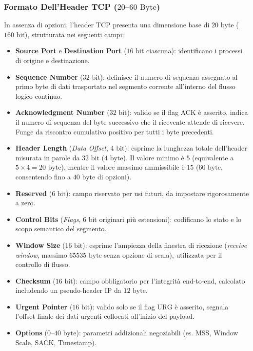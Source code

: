 \documentclass[11pt, a4paper]{article}
\begin{document}
\subsubsection{Formato Dell'Header TCP ($20\text{--}60\text{ Byte}$)}
In assenza di opzioni, l'header TCP presenta una dimensione base di $20\text{ byte}$ ($160\text{ bit}$), strutturata nei seguenti campi:
\begin{itemize}
    \item \textbf{Source Port} e \textbf{Destination Port} ($16\text{ bit}$ ciascuna): identificano i processi di origine e destinazione.
    \item \textbf{Sequence Number} ($32\text{ bit}$): definisce il numero di sequenza assegnato al primo byte di dati trasportato nel segmento corrente all'interno del flusso logico continuo.
    \item \textbf{Acknowledgment Number} ($32\text{ bit}$): valido se il flag ACK è asserito, indica il numero di sequenza del byte successivo che il ricevente attende di ricevere. Funge da riscontro cumulativo positivo per tutti i byte precedenti.
    \item \textbf{Header Length} (\emph{Data Offset}, $4\text{ bit}$): esprime la lunghezza totale dell'header misurata in parole da $32\text{ bit}$ ($4\text{ byte}$). Il valore minimo è $5$ (equivalente a $5 \times 4 = 20\text{ byte}$), mentre il valore massimo ammissibile è $15$ ($60\text{ byte}$, consentendo fino a $40\text{ byte}$ di opzioni).
    \item \textbf{Reserved} ($6\text{ bit}$): campo riservato per usi futuri, da impostare rigorosamente a zero.
    \item \textbf{Control Bits} (\emph{Flags}, $6$ bit originari più estensioni): codificano lo stato e lo scopo semantico del segmento.
    \item \textbf{Window Size} ($16\text{ bit}$): esprime l'ampiezza della finestra di ricezione (\emph{receive window}, massimo $65535\text{ byte}$ senza opzione di scala), utilizzata per il controllo di flusso.
    \item \textbf{Checksum} ($16\text{ bit}$): campo obbligatorio per l'integrità end-to-end, calcolato includendo un pseudo-header IP da $12\text{ byte}$.
    \item \textbf{Urgent Pointer} ($16\text{ bit}$): valido solo se il flag URG è asserito, segnala l'offset finale dei dati urgenti collocati all'inizio del payload.
    \item \textbf{Options} ($0$--$40\text{ byte}$): parametri addizionali negoziabili (es. MSS, Window Scale, SACK, Timestamp).
\end{itemize}
\end{document}
